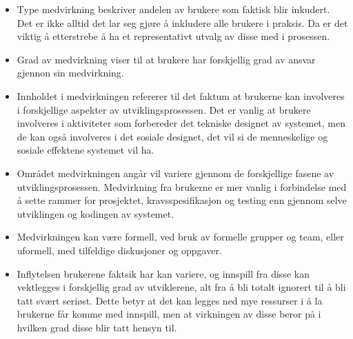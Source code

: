 \begin{itemize}
\item Type medvirkning beskriver andelen av brukere som faktisk blir inkudert. Det er ikke alltid det lar seg gjøre å inkludere alle brukere i praksis. Da er det viktig å etterstrebe å ha et representativt utvalg av disse med i prosessen.
\item Grad av medvirkning viser til at brukere har forskjellig grad av ansvar gjennon sin medvirkning.
\item Innholdet i medvirkningen refererer til det faktum at brukerne kan involveres i forskjellige aspekter av utviklingsprosessen. Det er vanlig at brukere involveres i aktiviteter som forbereder det tekniske designet av systemet, men de kan også involveres i det sosiale designet, det vil si de menneskelige og sosiale effektene systemet vil ha.
\item Området medvirkningen angår vil variere gjennom de forskjellige fasene av utviklingsprosessen. Medvirkning fra brukerne er mer vanlig i forbindelse med å sette rammer for prosjektet, kravsspesifikasjon og testing enn gjennom selve utviklingen og kodingen av systemet.
\item Medvirkningen kan være formell, ved bruk av formelle grupper og team, eller uformell, med tilfeldige diskusjoner og oppgaver.
\item Inflytelsen brukerene faktsik har kan variere, og innspill fra disse kan vektlegges i forskjellig grad av utviklerene, alt fra å bli totalt ignorert til å bli tatt svært seriøst. Dette betyr at det kan legges ned mye ressurser i å la brukerne får komme med innspill, men at virkningen av disse beror på i hvilken grad disse blir tatt hensyn til.
\end{itemize}

